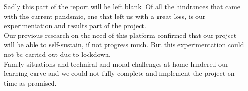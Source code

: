 Sadly this part of the report will be left blank. Of all the hindrances that came with the current pandemic, one that left us with a great loss, is our experimentation and results part of the project.\\
Our previous research on the need of this platform confirmed that our project will be able to self-sustain, if not progress much. But this experimentation could not be carried out due to lockdown.\\ 
Family situations and technical and moral challenges at home hindered our learning curve and we could not fully complete and implement the project on time as promised.